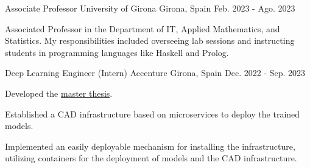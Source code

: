 

\begin{cventries}

  \cventry
  {Associate Professor} %
  {University of Girona} %
  {Girona, Spain} %
  {Feb. 2023 - Ago. 2023} %
  {
    \begin{cvitems} %
    \item {Associated Professor in the Department of IT,
      Applied Mathematics, and Statistics.
      My responsibilities included overseeing lab sessions and
      instructing students in programming languages like Haskell and Prolog.}
    \end{cvitems}
    }


    \cventry
    {Deep Learning Engineer (Intern)} %
    {Accenture} %
    {Girona, Spain} %
    {Dec. 2022 - Sep. 2023} %
    {
    \begin{cvitems}
    \item {Developed the \href{https://github.com/wilberquito/melanoma.thesis}{\color{awesome-emerald}master thesis}.}
    \item {Established a CAD infrastructure based on microservices to deploy the trained models.}
    \item {Implemented an easily deployable mechanism for
        installing the infrastructure, utilizing containers for the deployment
      of models and the CAD infrastructure.}
    \end{cvitems}
    }


\end{cventries}
